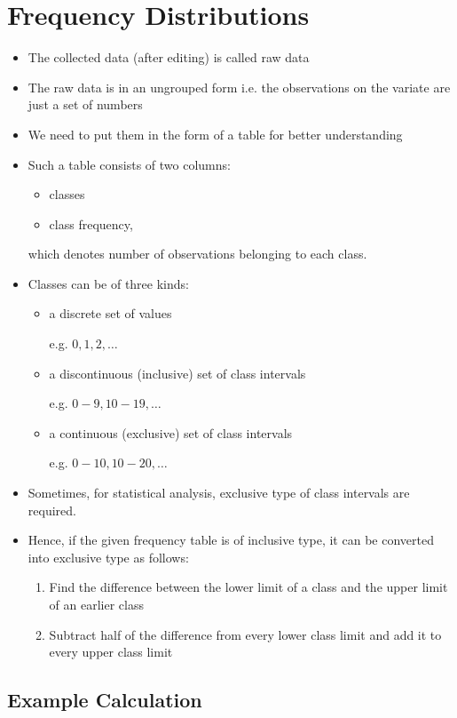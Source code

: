 \documentclass[
10pt, %
a4paper, %
]{report}
\begin{document}
\section{Frequency Distributions}
\begin{itemize}
\item The collected data (after editing) is
called raw data
\item The raw data is in an ungrouped form i.e. the observations on the variate are just a set of numbers
\item We need to put them in the form of a table for better understanding
\item Such a table consists of two columns:
\begin{itemize}
\item classes
\item class frequency,
\end{itemize}
which denotes number of observations belonging to
each class.
\item Classes can be of three kinds:
\begin{itemize}
\item a discrete set of values
\item[e.g.] \(0, 1, 2, \dots\)
\item a discontinuous (inclusive) set of class intervals
\item[e.g.] \(0-9, 10-19, \dots\)
\item a continuous (exclusive) set of class intervals
\item[e.g.] \(0-10, 10-20, \dots\)
\end{itemize}
\item Sometimes, for statistical analysis, exclusive type of class intervals are required.
\item Hence, if the given frequency table is of inclusive type, it can be converted into exclusive type as follows:
\begin{enumerate}
\item Find the difference between the lower limit of a class and the upper limit of an earlier class
\item Subtract half of the difference from every lower class limit and add it to every upper class limit
\end{enumerate}
\end{itemize}

\subsection{Example Calculation}
\end{document}
